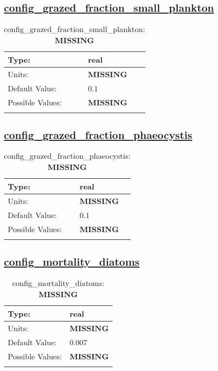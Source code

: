 \subsection[config\_grazed\_fraction\_small\_plankton]{\hyperref[sec:nm_tab_biogeochemistry]{config\_grazed\_fraction\_small\_plankton}}
\label{subsec:nm_sec_config_grazed_fraction_small_plankton}
\begin{center}
\begin{longtable}{| p{2.0in} || p{4.0in} |}
    \hline
    Type: & real \\
    \hline
    Units: & {\bf \color{red} MISSING} \\
    \hline
    Default Value: & 0.1 \\
    \hline
    Possible Values: & {\bf \color{red} MISSING} \\
    \hline
    \caption{config\_grazed\_fraction\_small\_plankton: {\bf \color{red} MISSING}}
\end{longtable}
\end{center}
\subsection[config\_grazed\_fraction\_phaeocystis]{\hyperref[sec:nm_tab_biogeochemistry]{config\_grazed\_fraction\_phaeocystis}}
\label{subsec:nm_sec_config_grazed_fraction_phaeocystis}
\begin{center}
\begin{longtable}{| p{2.0in} || p{4.0in} |}
    \hline
    Type: & real \\
    \hline
    Units: & {\bf \color{red} MISSING} \\
    \hline
    Default Value: & 0.1 \\
    \hline
    Possible Values: & {\bf \color{red} MISSING} \\
    \hline
    \caption{config\_grazed\_fraction\_phaeocystis: {\bf \color{red} MISSING}}
\end{longtable}
\end{center}
\subsection[config\_mortality\_diatoms]{\hyperref[sec:nm_tab_biogeochemistry]{config\_mortality\_diatoms}}
\label{subsec:nm_sec_config_mortality_diatoms}
\begin{center}
\begin{longtable}{| p{2.0in} || p{4.0in} |}
    \hline
    Type: & real \\
    \hline
    Units: & {\bf \color{red} MISSING} \\
    \hline
    Default Value: & 0.007 \\
    \hline
    Possible Values: & {\bf \color{red} MISSING} \\
    \hline
    \caption{config\_mortality\_diatoms: {\bf \color{red} MISSING}}
\end{longtable}
\end{center}
